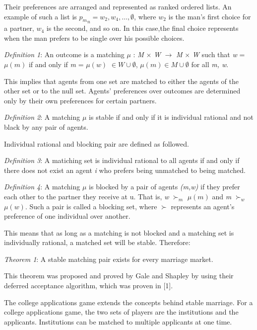 \documentclass[conference]{IEEEtran}
\begin{document}
Their preferences are arranged and represented as ranked 
ordered lists.  An example of such a list is
\( {p_m}_n ={w_2}, {w_4}, \ldots, \emptyset \),
where \( {w_2} \) is the man's first choice for a partner, 
\( {w_4} \) is the second, and so on.  In this case,the final 
choice represents when the man prefers to be single over 
his possible choices.

\emph{Definition 1}:  An outcome is a matching
 \( \mu \) : \emph{M} \( \times \)  \emph{W} \( \rightarrow \)  \emph{M} \( \times \)  \emph{W} such that
\emph{w} = \( \mu(m) \) if and only if 
\emph{m} = \( \mu(w) \) \( \in W \cup \emptyset \), \( \mu(m) \in M \cup \emptyset \)
for all \emph{m, w}.

This implies that agents from one set are matched to either the agents
of the other set or to the null set.  Agents' preferences over outcomes are
determined only by their own preferences for certain partners.

\emph{Definition 2}:  A matching \( \mu \) is stable if and only if it is individual rational and
not black by any pair of agents.

Individual rational and blocking pair are defined as followed.

\emph{Definition 3}:  A matiching set is individual rational to all agents if and only if
there does not exist an agent \emph{i} who prefers being unmatched to being
matched.

\emph{Definition 4}:  A matching \( \mu \) is blocked by a pair of agents \emph{(m,w)} if they
prefer each other to the partner they receive at u.  That is, \emph{w} \(\succ_m \) \( \mu (m) \)
and \emph{m} \(\succ_w \) \( \mu (w) \).  Such a pair is called a blocking set,
where \(\succ \) represents an agent's preference of one individual over another.

This means that as long as a matching is not blocked and a matching set is individually
rational, a matched set will be stable.  Therefore:

\emph{Theorem 1}:  A stable matching pair exists for every marriage market.

This theorem was proposed and proved by Gale and Shapley
by using their deferred acceptance algorithm, which was proven in [1].

The college applications game extends the concepts behind stable
marriage.  For a college applications game, the two sets of players are the
institutions and the applicants.  Institutions can be matched to multiple
applicants at one time.
\end{document}
